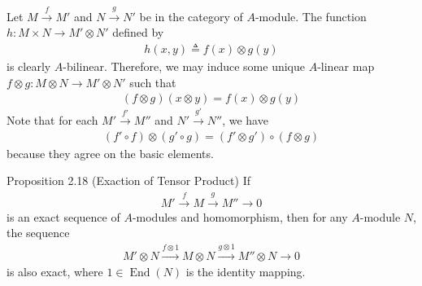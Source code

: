 \documentclass{report}
\begin{document}
\begin{mdframed}
Let $M\overset{f}{\longrightarrow }M'$ and $N\overset{g}{\longrightarrow }N'$ be in the category of $A$-module. The function  $h:M\times N \rightarrow M' \otimes  N'$ defined by 
\begin{align*}
h(x,y)\triangleq f(x)\otimes  g(y)
\end{align*}
is clearly $A$-bilinear. Therefore, we may induce some unique $A$-linear map  $f\otimes  g:M\otimes  N\rightarrow M'\otimes  N'$ such that 
\begin{align*}
  (f\otimes  g)(x\otimes  y)=f(x)\otimes  g(y)
\end{align*}
Note that for each $M' \overset{f'}{\longrightarrow }M''$ and $N'\overset{g'}{\longrightarrow }N''$, we have 
\begin{align*}
  (f' \circ f) \otimes  (g' \circ g)= (f'\otimes  g')\circ (f\otimes  g)
\end{align*}
because they agree on the basic elements. 
\end{mdframed}
\begin{question}{Proposition 2.18 (Exaction of Tensor Product)}{}
If 
\begin{align}
\label{Mfg}
M'\overset{f}{\longrightarrow }M\overset{g}{\longrightarrow } M'' \rightarrow  0
\end{align}
is an exact sequence of $A$-modules and homomorphism, then for any $A$-module  $N$, the sequence 
 \begin{align*}
M' \otimes  N \overset{f \otimes 1 }{\longrightarrow } M \otimes  N \overset{g \otimes  1}{\longrightarrow }M'' \otimes  N \rightarrow  0
\end{align*}
is also exact, where $1 \in \operatorname{End}(N)$ is the identity mapping. 
\end{question}
\end{document}
